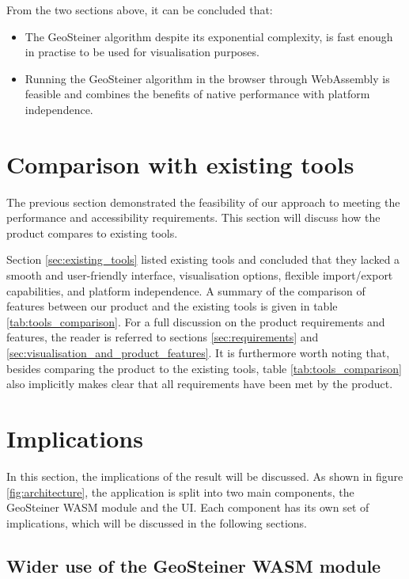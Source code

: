 \documentclass{l4proj}
\begin{document}
From the two sections above, it can be concluded that:
\begin{itemize}
    \item The GeoSteiner algorithm despite its exponential complexity, is fast enough in practise to be used for visualisation purposes.
    \item Running the GeoSteiner algorithm in the browser through WebAssembly is feasible and combines the benefits of native performance with platform independence.
\end{itemize}

\section{Comparison with existing tools}
The previous section demonstrated the feasibility of our approach to meeting the performance and accessibility requirements.
This section will discuss how the product compares to existing tools.

Section \ref{sec:existing_tools} listed existing tools and concluded that they lacked a smooth and user-friendly interface, visualisation options, flexible import/export capabilities, and platform independence. A summary of the comparison of features between our product and the existing tools is given in table \ref{tab:tools_comparison}. For a full discussion on the product requirements and features, the reader is referred to sections \ref{sec:requirements} and \ref{sec:visualisation_and_product_features}.
It is furthermore worth noting that, besides comparing the product to the existing tools, table \ref{tab:tools_comparison} also implicitly makes clear that all requirements have been met by the product.




\section{Implications}
\label{sec:implications}
In this section, the implications of the result will be discussed. As shown in figure \ref{fig:architecture}, the application is split into two main components, the GeoSteiner WASM module and the UI. Each component has its own set of implications, which will be discussed in the following sections.
\subsection{Wider use of the GeoSteiner WASM module}
\end{document}
